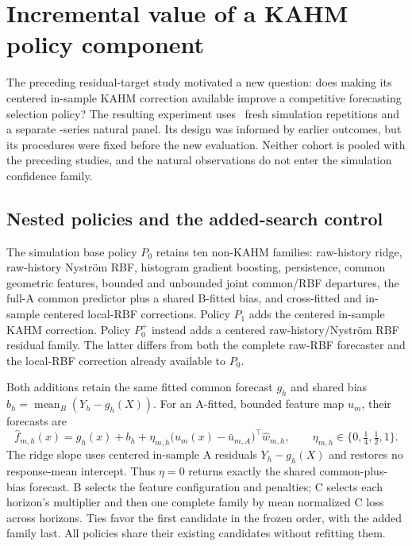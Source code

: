 \section{Incremental value of a KAHM policy component}
\label{sec:policy-augmentation-supp}

The preceding residual-target study motivated a new question: does making
its centered in-sample KAHM correction available improve a competitive
forecasting selection policy? The resulting experiment uses
\PARepetitions\ fresh simulation repetitions and a separate
\PANaturalSeries-series natural panel. Its design was informed by earlier
outcomes, but its procedures were fixed before the new evaluation.
Neither cohort is pooled with the preceding studies, and the natural
observations do not enter the simulation confidence family.

\subsection{Nested policies and the added-search control}

The simulation base policy $P_0$ retains ten non-KAHM families: raw-history
ridge, raw-history Nystr\"om RBF, histogram gradient boosting, persistence,
common geometric features, bounded and unbounded joint common/RBF
departures, the full-A common predictor plus a shared B-fitted bias, and
cross-fitted and in-sample centered local-RBF corrections. Policy $P_1$
adds the centered in-sample KAHM correction. Policy $P_0^+$ instead adds
a centered raw-history/Nystr\"om RBF residual family. The latter differs
from both the complete raw-RBF forecaster and the local-RBF correction
already available to $P_0$.

Both additions retain the same fitted common forecast $g_h$ and shared
bias $b_h=\operatorname{mean}_B(Y_h-g_h(X))$. For an A-fitted, bounded
feature map $u_m$, their forecasts are
\begin{equation}
 \widehat f_{m,h}(x)=g_h(x)+b_h+
 \eta_{m,h}\bigl(u_m(x)-\bar u_{m,A}\bigr)^\top\widehat w_{m,h},
 \qquad \eta_{m,h}\in\{0,\tfrac14,\tfrac12,1\}.
 \label{eq:supp-pa-correction}
\end{equation}
The ridge slope uses centered in-sample A residuals
$Y_h-g_h(X)$ and restores no response-mean intercept. Thus $\eta=0$
returns exactly the shared common-plus-bias forecast. B selects the
feature configuration and penalties; C selects each horizon's multiplier
and then one complete family by mean normalized C loss across horizons.
Ties favor the first candidate in the frozen order, with the added family
last. All policies share their existing candidates without refitting them.

